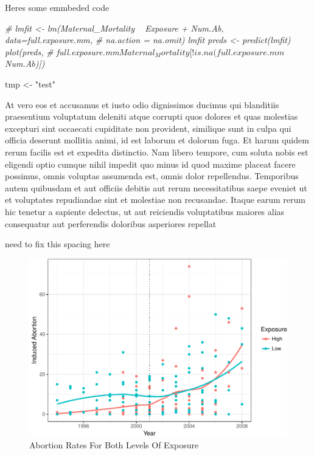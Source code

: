 \documentclass[11pt,]{article}
\makeatletter
\newenvironment{Shaded}{\begin{snugshade}}{\end{snugshade}}
\newcommand{\StringTok}[1]{\textcolor[rgb]{0.31,0.60,0.02}{#1}}
\newcommand{\CommentTok}[1]{\textcolor[rgb]{0.56,0.35,0.01}{\textit{#1}}}
\newcommand{\NormalTok}[1]{#1}
\def\maxwidth{\ifdim\Gin@nat@width>\linewidth\linewidth
\else\Gin@nat@width\fi}
\let\Oldincludegraphics\includegraphics
\renewcommand{\includegraphics}[1]{\Oldincludegraphics[width=\maxwidth]{#1}}
\makeatother
\begin{document}
Heres some emmbeded code

\begin{Shaded}
\begin{Highlighting}[]
\CommentTok{# lmfit <- lm(Maternal_Mortality ~ Exposure + Num.Ab, data=full.exposure.mm,}
\CommentTok{# na.action = na.omit) lmfit preds <- predict(lmfit) plot(preds,}
\CommentTok{# full.exposure.mm$Maternal_Mortality[!is.na(full.exposure.mm$Num.Ab)])}

\NormalTok{tmp <-}\StringTok{ "test"}
\end{Highlighting}
\end{Shaded}

At vero eos et accusamus et iusto odio dignissimos ducimus qui
blanditiis praesentium voluptatum deleniti atque corrupti quos dolores
et quas molestias excepturi sint occaecati cupiditate non provident,
similique sunt in culpa qui officia deserunt mollitia animi, id est
laborum et dolorum fuga. Et harum quidem rerum facilis est et expedita
distinctio. Nam libero tempore, cum soluta nobis est eligendi optio
cumque nihil impedit quo minus id quod maxime placeat facere possimus,
omnis voluptas assumenda est, omnis dolor repellendus. Temporibus autem
quibusdam et aut officiis debitis aut rerum necessitatibus saepe eveniet
ut et voluptates repudiandae sint et molestiae non recusandae. Itaque
earum rerum hic tenetur a sapiente delectus, ut aut reiciendis
voluptatibus maiores alias consequatur aut perferendis doloribus
asperiores repellat

need to fix this spacing here

\begin{figure}
\centering
\includegraphics{final-paper_files/figure-latex/unnamed-chunk-2-1.pdf}
\caption{Abortion Rates For Both Levels Of Exposure}
\end{figure}
\end{document}
